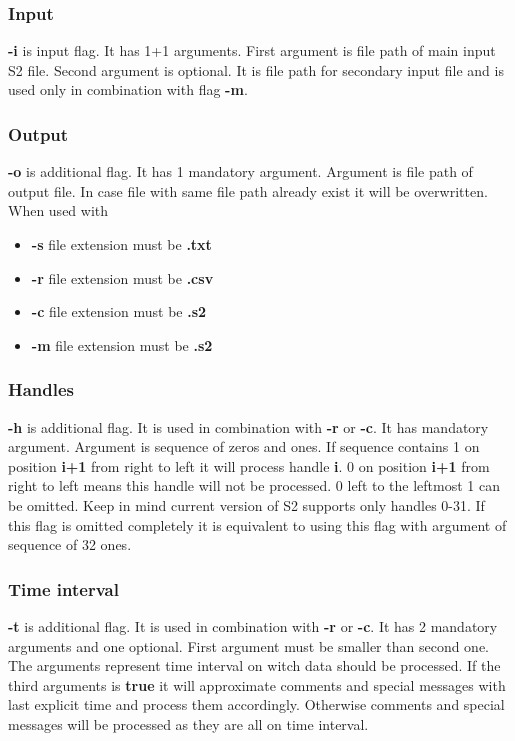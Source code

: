 \documentclass[english]{article}
\begin{document}
\subsubsection{Input}

 \textbf{-i} is input flag. It has 1+1 arguments. First argument is file path of main input S2 file. Second argument is optional. It is file path for secondary input file and is used only in combination with flag \textbf{-m}.

\subsubsection{Output}
\textbf{-o} is additional flag. It has 1 mandatory argument. Argument is file path of output file. In case file with same file path already exist it will be overwritten.
When used with
\begin{itemize}
\item \textbf{-s} file extension must be \textbf{.txt}
\item \textbf{-r} file extension must be \textbf{.csv}
\item \textbf{-c} file extension must be \textbf{.s2}
\item \textbf{-m} file extension must be \textbf{.s2}
\end{itemize}

\subsubsection{Handles}
 \textbf{-h} is additional flag.  It is used in combination with \textbf{-r} or \textbf{-c}. It has mandatory argument. Argument is sequence of zeros and ones. If sequence contains 1 on position \textbf{i+1} from right to left it will process handle \textbf{i}. 0 on position \textbf{i+1} from right to left means this handle will not be processed. 0 left to the leftmost 1 can be omitted. Keep in mind current version of S2 supports only handles 0-31. If this flag is omitted  completely it is equivalent to using this flag with argument of sequence of 32 ones.

\subsubsection{Time interval}
\textbf{-t} is additional flag. It is used in combination with \textbf{-r} or \textbf{-c}. It has 2 mandatory arguments and one optional. First argument must be smaller than second one. The arguments represent time interval on witch data should be processed. If the third arguments is \textbf{true} it will approximate comments and special messages with last explicit time and process them accordingly. Otherwise comments and special messages will be processed as they are all on time interval. 
\end{document}
